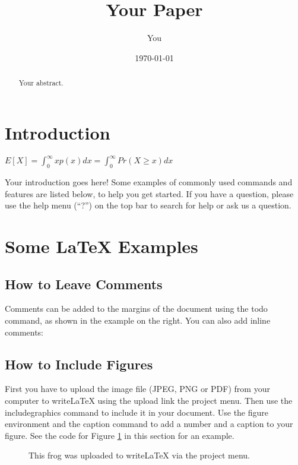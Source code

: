 \documentclass[a4paper]{article}
\title{Your Paper}
\author{You}
\date{\today}
\begin{document}
\maketitle

\begin{abstract}
Your abstract.
\end{abstract}

\section{Introduction}

$E[X]=\int^\infty_{0}xp(x)dx=\int^\infty_{0}Pr(X\ge x)dx$

Your introduction goes here! Some examples of commonly used commands and features are listed below, to help you get started. If you have a question, please use the help menu (``?'') on the top bar to search for help or ask us a question.

\section{Some \LaTeX{} Examples}
\label{sec:examples}

\subsection{How to Leave Comments}

Comments can be added to the margins of the document using the  todo command, as shown in the example on the right. You can also add inline comments:


\subsection{How to Include Figures}

First you have to upload the image file (JPEG, PNG or PDF) from your computer to writeLaTeX using the upload link the project menu. Then use the includegraphics command to include it in your document. Use the figure environment and the caption command to add a number and a caption to your figure. See the code for Figure \ref{fig:frog} in this section for an example.

\begin{figure}
\centering
\caption{\label{fig:frog}This frog was uploaded to writeLaTeX via the project menu.}
\end{figure}
\end{document}
